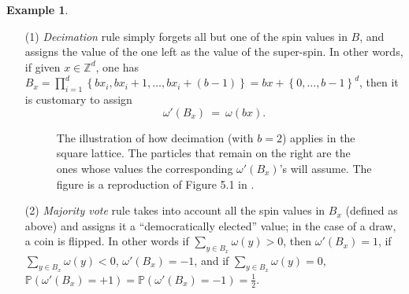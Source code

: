 \documentclass[12pt]{article}
\renewcommand{\P}{\mathbb{P}}
\newcommand{\Z}{\mathbb{Z}}
\newcommand{\set}[1]{\left\{#1\right\}}
\newcommand{\1}{\mathbbm{1}}
\newcommand{\5}{\vspace{0.5cm}}
\theoremstyle{definition}
\newtheorem{ex}[thm]{Example}
\begin{document}
\begin{ex}\label{RG:example}
~
\begin{itemize}
	\item[(1)] \textit{Decimation} rule simply forgets all but one of the spin values in $B$, and assigns the value of the one left as the value of the super-spin. In other words, if given $x\in\Z^d$, one has $B_x=\prod_{i=1}^d \set{b x_i,b x_i+1,\ldots,b x_i+(b-1)}=bx+\set{0,\ldots,b-1}^d$, then it is customary to assign
	$$\omega'(B_x) ~=~ \omega(bx).$$
\vspace{-0.6cm}
\begin{figure}[h!]
\centering
{}
\caption{The illustration of how decimation (with $b=2$) applies in the square lattice. The particles that remain on the right are the ones whose values the corresponding $\omega'(B_x)$'s will assume. The figure is a reproduction of Figure 5.1 in \cite{Ber}.}
\end{figure}
\vspace{-0.5cm}
	\item[(2)] \textit{Majority vote} rule takes into account all the spin values in $B_x$ (defined as above) and assigns it a ``democratically elected'' value; in the case of a draw, a coin is flipped. In other words if $\sum_{y\in B_x}\omega(y)>0$, then $\omega'(B_x)=1$, if $\sum_{y\in B_x}\omega(y)<0$, $\omega'(B_x)=-1$, and if $\sum_{y\in B_x}\omega(y)=0$, $\P(\omega'(B_x)=+1)=\P(\omega'(B_x)=-1)=\frac{1}{2}$.
\end{itemize}
\end{ex}
\end{document}
